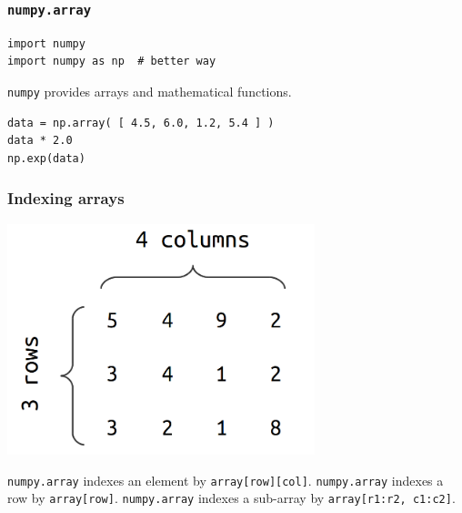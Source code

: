 \documentclass[11pt]{beamer}
\begin{document}
\begin{frame}[fragile]
  \frametitle{\texttt{numpy.array}}
  \Enlarge

  \begin{Verbatim}
import numpy
import numpy as np  # better way
  \end{Verbatim}
  \begin{enumerate}
  \myitem  \texttt{numpy} provides arrays and mathematical functions.
  \end{enumerate}
  \begin{Verbatim}
data = np.array( [ 4.5, 6.0, 1.2, 5.4 ] )
data * 2.0
np.exp(data)
  \end{Verbatim}
\end{frame}



\begin{frame}[fragile]
  \frametitle{Indexing arrays}
  \Enlarge

  \includegraphics[width=0.67\textwidth]{./img/ndarray.png}

  \begin{enumerate}
  \myitem  \texttt{numpy.array} indexes an element by \texttt{array[row][col]}.
  \myitem  \texttt{numpy.array} indexes a row by \texttt{array[row]}.
  \myitem  \texttt{numpy.array} indexes a sub-array by \texttt{array[r1:r2, c1:c2]}.
  \end{enumerate}
\end{frame}
\end{document}
